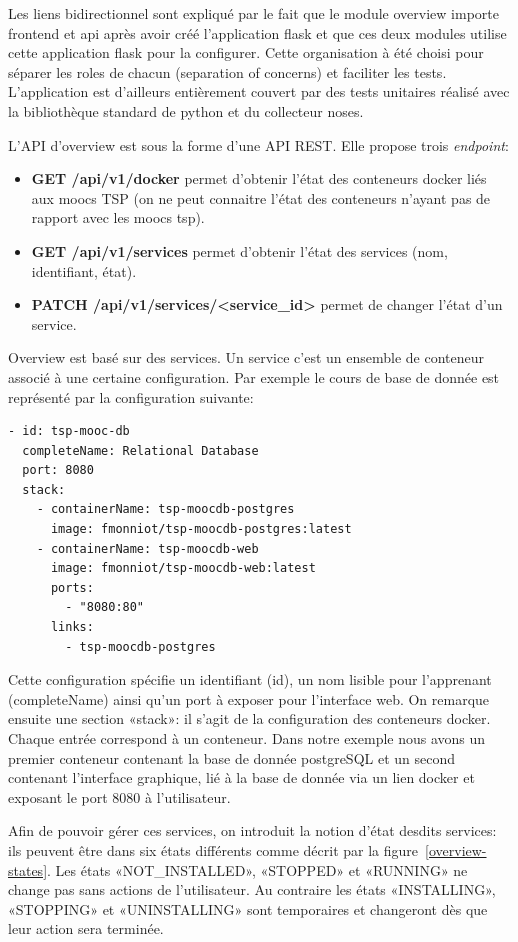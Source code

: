 \documentclass[a4paper,11pt]{report}
\begin{document}
Les liens bidirectionnel sont expliqué par le fait que le module overview importe frontend et api après avoir créé l'application flask et que ces deux modules utilise cette application flask pour la configurer. Cette organisation à été choisi pour séparer les roles de chacun (separation of concerns) et faciliter les tests. L'application est d'ailleurs entièrement couvert par des tests unitaires réalisé avec la bibliothèque standard de python et du collecteur noses.

L'API d'overview est sous la forme d'une API REST. Elle propose trois \textit{endpoint}:
\begin{itemize}
  \item \textbf{GET /api/v1/docker} permet d'obtenir l'état des conteneurs docker liés aux moocs TSP (on ne peut connaitre l'état des conteneurs n'ayant pas de rapport avec les moocs tsp).
  \item \textbf{GET /api/v1/services} permet d'obtenir l'état des services (nom, identifiant, état).
  \item \textbf{PATCH /api/v1/services/<service\_id>} permet de changer l'état d'un service.
\end{itemize}

Overview est basé sur des services. Un service c'est un ensemble de conteneur associé à une certaine configuration. Par exemple le cours de base de donnée est représenté par la configuration suivante:
\begin{lstlisting}[caption={Configuration du service mooc-db}]
- id: tsp-mooc-db
  completeName: Relational Database
  port: 8080
  stack:
    - containerName: tsp-moocdb-postgres
      image: fmonniot/tsp-moocdb-postgres:latest
    - containerName: tsp-moocdb-web
      image: fmonniot/tsp-moocdb-web:latest
      ports:
        - "8080:80"
      links:
        - tsp-moocdb-postgres
\end{lstlisting}

Cette configuration spécifie un identifiant (id), un nom lisible pour l'apprenant (completeName) ainsi qu'un port à exposer pour l'interface web. On remarque ensuite une section «stack»: il s'agit de la configuration des conteneurs docker. Chaque entrée correspond à un conteneur. Dans notre exemple nous avons un premier conteneur contenant la base de donnée postgreSQL et un second contenant l'interface graphique, lié à la base de donnée via un lien docker et exposant le port 8080 à l'utilisateur.

Afin de pouvoir gérer ces services, on introduit la notion d'état desdits services: ils peuvent être dans six états différents comme décrit par la figure~\ref{overview-states}. Les états «NOT\_INSTALLED», «STOPPED» et «RUNNING» ne change pas sans actions de l'utilisateur. Au contraire les états «INSTALLING», «STOPPING» et «UNINSTALLING» sont temporaires et changeront dès que leur action sera terminée.
\end{document}

